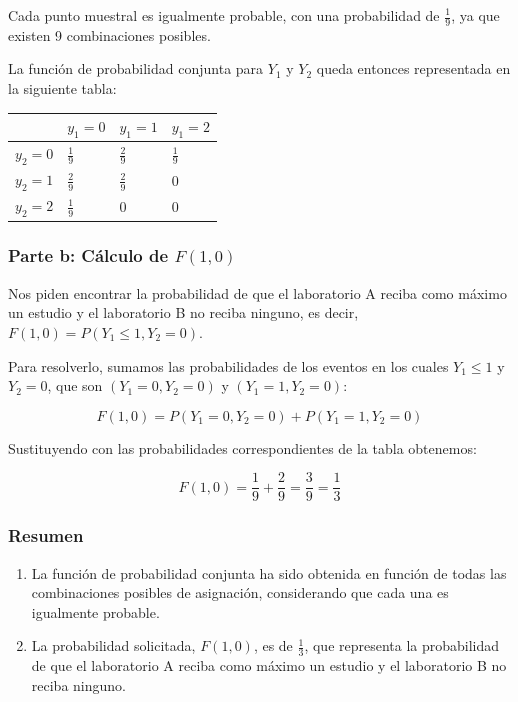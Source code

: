 \documentclass[
]{article}
\providecommand{\tightlist}{%
  \setlength{\itemsep}{0pt}\setlength{\parskip}{0pt}}
\begin{document}
Cada punto muestral es igualmente probable, con una probabilidad de \(\frac{1}{9}\), ya que existen 9 combinaciones posibles.

La función de probabilidad conjunta para \(Y_1\) y \(Y_2\) queda entonces representada en la siguiente tabla:

\begin{longtable}[]{@{}llll@{}}
\toprule\noalign{}
& \(y_1 = 0\) & \(y_1 = 1\) & \(y_1 = 2\) \\
\midrule\noalign{}
\endhead
\bottomrule\noalign{}
\endlastfoot
\(y_2 = 0\) & \(\frac{1}{9}\) & \(\frac{2}{9}\) & \(\frac{1}{9}\) \\
\(y_2 = 1\) & \(\frac{2}{9}\) & \(\frac{2}{9}\) & \(0\) \\
\(y_2 = 2\) & \(\frac{1}{9}\) & \(0\) & \(0\) \\
\end{longtable}

\subsubsection{\texorpdfstring{Parte b: Cálculo de \(F(1,0)\)}{Parte b: Cálculo de F(1,0)}}\label{parte-b-cuxe1lculo-de-f10}

Nos piden encontrar la probabilidad de que el laboratorio A reciba como máximo un estudio y el laboratorio B no reciba ninguno, es decir, \(F(1,0) = P(Y_1 \leq 1, Y_2 = 0)\).

Para resolverlo, sumamos las probabilidades de los eventos en los cuales \(Y_1 \leq 1\) y \(Y_2 = 0\), que son \((Y_1 = 0, Y_2 = 0)\) y \((Y_1 = 1, Y_2 = 0)\):

\[
F(1,0) = P(Y_1 = 0, Y_2 = 0) + P(Y_1 = 1, Y_2 = 0)
\]

Sustituyendo con las probabilidades correspondientes de la tabla obtenemos:

\[
F(1,0) = \frac{1}{9} + \frac{2}{9} = \frac{3}{9} = \frac{1}{3}
\]

\subsubsection{Resumen}\label{resumen}

\begin{enumerate}
\def\labelenumi{\arabic{enumi}.}
\tightlist
\item
  La función de probabilidad conjunta ha sido obtenida en función de todas las combinaciones posibles de asignación, considerando que cada una es igualmente probable.
\item
  La probabilidad solicitada, \(F(1,0)\), es de \(\frac{1}{3}\), que representa la probabilidad de que el laboratorio A reciba como máximo un estudio y el laboratorio B no reciba ninguno.
\end{enumerate}
\end{document}
